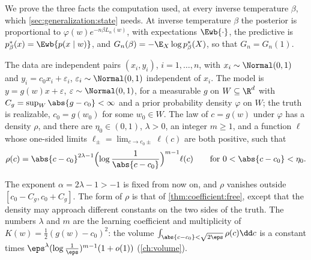 \begin{refsection}
We prove the three facts the computation used, at every inverse temperature $\beta$, which \cref{sec:generalization:state} needs. At inverse temperature $\beta$ the posterior is proportional to $\varphi(w)e^{-n\beta L_n(w)}$, with expectations $\Ewb{\cdot}$, the predictive is $p^*_\beta(x)=\Ewb{p(x\mid w)}$, and $G_n(\beta)=-\E_X\log p^*_\beta(X)$, so that $G_n=G_n(1)$.

\begin{assumption}\label{ass:generalization:onecoef}
The data are independent pairs $(x_i,y_i)$, $i=1,\dots,n$, with $x_i\sim\Normal(0,1)$ and $y_i=c_0x_i+\varepsilon_i$, $\varepsilon_i\sim\Normal(0,1)$ independent of $x_i$. The model is $y=g(w)x+\varepsilon$, $\varepsilon\sim\Normal(0,1)$, for a measurable $g$ on $W\subseteq\R^d$ with $C_g=\sup_W\abs{g-c_0}<\infty$ and a prior probability density $\varphi$ on $W$; the truth is realizable, $c_0=g(w_0)$ for some $w_0\in W$. The law of $c=g(w)$ under $\varphi$ has a density $\rho$, and there are $\eta_0\in(0,1)$, $\lambda>0$, an integer $m\ge1$, and a function $\ell$ whose one-sided limits $\ell_\pm=\lim_{c\to c_0\pm}\ell(c)$ are both positive, such that
\[
\rho(c)=\abs{c-c_0}^{2\lambda-1}\Bigl(\log\frac1{\abs{c-c_0}}\Bigr)^{m-1}\ell(c)\qquad\text{for }0<\abs{c-c_0}<\eta_0.
\]
\end{assumption}

The exponent $\alpha=2\lambda-1>-1$ is fixed from now on, and $\rho$ vanishes outside $[c_0-C_g,c_0+C_g]$. The form of $\rho$ is that of \cref{thm:coefficient:free}, except that the density may approach different constants on the two sides of the truth. The numbers $\lambda$ and $m$ are the learning coefficient and multiplicity of $K(w)=\frac12(g(w)-c_0)^2$: the volume $\int_{\abs{c-c_0}<\sqrt{2\eps}}\rho(c)\dd c$ is a constant times $\eps^\lambda(\log\frac1\eps)^{m-1}(1+o(1))$ (\cref{ch:volume}).


\end{refsection}

